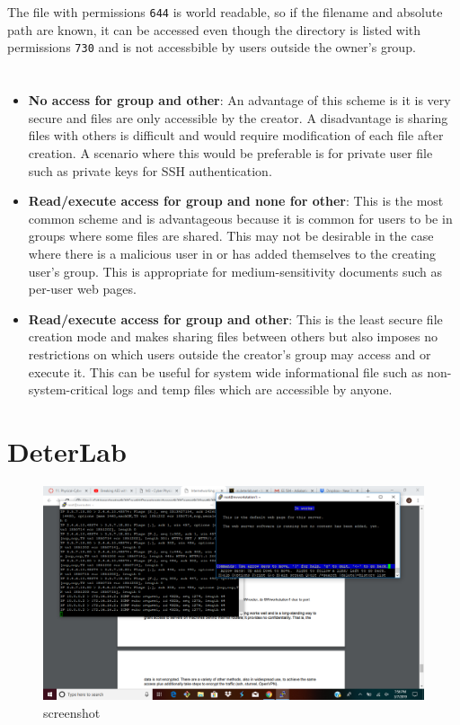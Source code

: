 \documentclass[letterpaper]{article}
\begin{document}
\section{}
The file with permissions \texttt{644} is world readable, so if the filename and absolute path are known, it can be accessed even though the directory is listed with permissions \texttt{730} and is not accessbible by users outside the owner's group.



\section{}

\begin{itemize}
    \item \textbf{No access for group and other}: An advantage of this scheme is it is very secure and files are only accessible by the creator. A disadvantage is sharing files with others is difficult and would require modification of each file after creation. A scenario where this would be preferable is for private user file such as private keys for SSH authentication.
    
    
    \item \textbf{Read/execute access for group and none for other}: This is the most common scheme and is advantageous because it is common for users to be in groups where some files are shared. This may not be desirable in the case where there is a malicious user in or has added themselves to the creating user's group. This is appropriate for medium-sensitivity documents such as per-user web pages.
    
    \item \textbf{Read/execute access for group and other}: This is the least secure file creation mode and makes sharing files between others but also imposes no restrictions on which users outside the creator's group may access and or execute it. This can be useful for system wide informational file such as non-system-critical logs and temp files which are accessible by anyone.
\end{itemize}

\newpage
\section{DeterLab}
\begin{figure}[h!]
    \centering
    \includegraphics[width=\textwidth]{576HW6.png}
    \caption{screenshot}
    \label{fig:my_label}
\end{figure}
\end{document}
